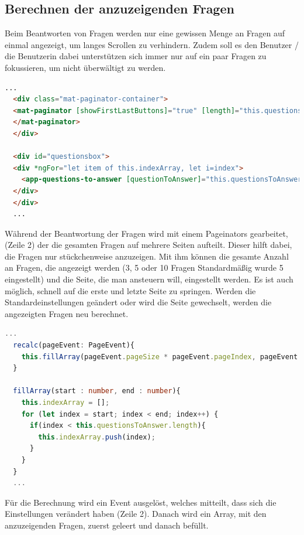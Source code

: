 \subsection{Berechnen der anzuzeigenden Fragen}
Beim Beantworten von Fragen werden nur eine gewissen Menge an Fragen auf einmal angezeigt, um langes Scrollen zu 
verhindern. Zudem soll es den Benutzer / die Benutzerin dabei unterstützen sich immer nur auf ein paar Fragen zu fokussieren, um nicht überwältigt zu werden.
\begin{lstlisting}[language=html, caption=Pageinator, label=lst:Berechnen anzuzeigender Fragen HTML]
  ...   
  <div class="mat-paginator-container">
  <mat-paginator [showFirstLastButtons]="true" [length]="this.questions.length" [pageSize]="pageSizeOptions[1]" [pageSizeOptions]="pageSizeOptions" aria-label="Select page" (page)="recalc($event)">
  </mat-paginator>
  </div>

  <div id="questionsbox">
  <div *ngFor="let item of this.indexArray, let i=index">
    <app-questions-to-answer [questionToAnswer]="this.questionsToAnswer[item]"></app-questions-to-answer>
  </div>
  </div>
  ...
\end{lstlisting}
Während der Beantwortung der Fragen wird mit einem Pageinators gearbeitet, (Zeile 2) der die gesamten Fragen auf mehrere Seiten aufteilt. Dieser hilft dabei, die Fragen nur 
stückchenweise anzuzeigen. Mit ihm können die gesamte Anzahl an Fragen, die angezeigt werden 
(3, 5 oder 10 Fragen Standardmäßig wurde 5 eingestellt) und die Seite, die man ansteuern will, eingestellt werden.
Es ist auch möglich, schnell auf die erste und letzte Seite zu springen. Werden die Standardeinstellungen geändert oder wird die Seite gewechselt, werden die angezeigten Fragen neu berechnet. 
\newline
\newline
\begin{lstlisting}[language=TypeScript, caption=Berechnen der anzuzeigenden Fragen TypeScript, label=lst:Berechnen anzuzeigender Fragen HTML]
  ...
  recalc(pageEvent: PageEvent){
    this.fillArray(pageEvent.pageSize * pageEvent.pageIndex, pageEvent.pageSize * (pageEvent.pageIndex + 1));
  }
  
  fillArray(start : number, end : number){
    this.indexArray = [];
    for (let index = start; index < end; index++) {
      if(index < this.questionsToAnswer.length){
        this.indexArray.push(index);
      }
    }
  }
  ...
\end{lstlisting}
Für die Berechnung wird ein Event ausgelöst, welches mitteilt, dass sich die Einstellungen verändert haben (Zeile 2). 
Danach wird ein Array, mit den anzuzeigenden Fragen, zuerst geleert und danach befüllt.

